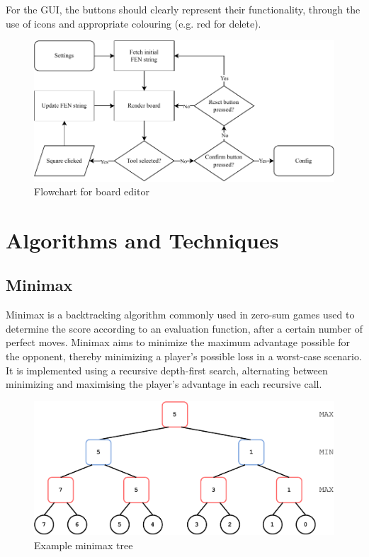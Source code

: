 \documentclass[../main/main.tex]{subfiles}
\begin{document}
For the GUI, the buttons should clearly represent their functionality, through the use of icons and appropriate colouring (e.g. red for delete).

\begin{figure}[H]
    \centering
    \includegraphics[width=\columnwidth]{../design/assets/editor_flowchart.pdf}
    \caption{Flowchart for board editor}
    \label{fig:editor-flowchart}
\end{figure}

\section{Algorithms and Techniques}
\subsection{Minimax}
\label{sec:design-minimax}
Minimax is a backtracking algorithm commonly used in zero-sum games used to determine the score according to an evaluation function, after a certain number of perfect moves. Minimax aims to minimize the maximum advantage possible for the opponent, thereby minimizing a player’s possible loss in a worst-case scenario. It is implemented using a recursive depth-first search, alternating between minimizing and maximising the player’s advantage in each recursive call.

\begin{figure}[H]
    \centering
    \includegraphics[width=\columnwidth]{../design/assets/minimax.pdf}
    \caption{Example minimax tree}
    \label{fig:minimax}
\end{figure}
\end{document}
